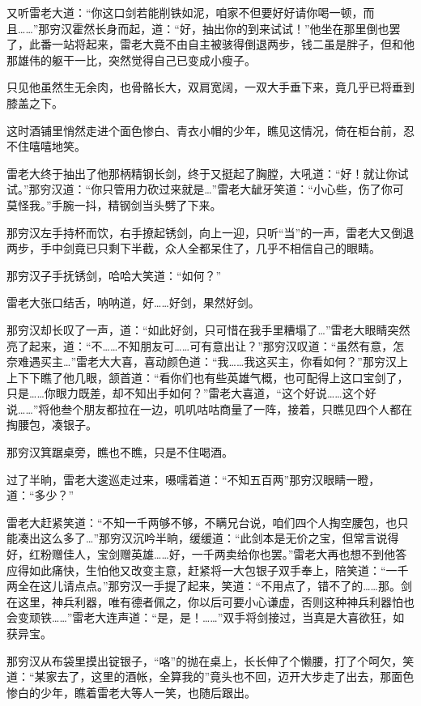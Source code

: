 \documentclass[12pt,oneside]{book}
\begin{document}
又听雷老大道：``你这口剑若能削铁如泥，咱家不但要好好请你喝一顿，而且\ldots\ldots{}''那穷汉霍然长身而起，道：``好，抽出你的到来试试！''他坐在那里倒也罢了，此番一站将起来，雷老大竟不由自主被骇得倒退两步，钱二虽是胖子，但和他那雄伟的躯干一比，突然觉得自己已变成小瘦子。

只见他虽然生无余肉，也骨骼长大，双肩宽阔，一双大手垂下来，竟几乎已将垂到膝盖之下。

这时酒铺里悄然走进个面色惨白、青衣小帽的少年，瞧见这情况，倚在柜台前，忍不住嘻嘻地笑。

雷老大终于抽出了他那柄精钢长剑，终于又挺起了胸膛，大吼道：``好！就让你试试。''那穷汉道：``你只管用力砍过来就是\ldots{}''雷老大龇牙笑道：``小心些，伤了你可莫怪我。''手腕一抖，精钢剑当头劈了下来。

那穷汉左手持杯而饮，右手撩起锈剑，向上一迎，只听``当''的一声，雷老大又倒退两步，手中剑竟已只剩下半截，众人全都呆住了，几乎不相信自己的眼睛。

那穷汉子手抚锈剑，哈哈大笑道：``如何？''

雷老大张口结舌，呐呐道，好\ldots\ldots 好剑，果然好剑。

那穷汉却长叹了一声，道：``如此好剑，只可惜在我手里糟塌了\ldots{}''雷老大眼睛突然亮了起来，道：``不\ldots\ldots 不知朋友可\ldots\ldots 可有意出让？''那穷汉叹道：``虽然有意，怎奈难遇买主\ldots{}''雷老大大喜，喜动颜色道：``我\ldots\ldots 我这买主，你看如何？''那穷汉上上下下瞧了他几眼，颔首道：``看你们也有些英雄气概，也可配得上这口宝剑了，只是\ldots\ldots 你眼力既差，却不知出手如何？''雷老大喜道，``这个好说\ldots\ldots 这个好说\ldots\ldots{}''将他叁个朋友都拉在一边，叽叽咕咕商量了一阵，接着，只瞧见四个人都在掏腰包，凑银子。

那穷汉箕踞桌旁，瞧也不瞧，只是不住喝酒。

过了半晌，雷老大逡巡走过来，嗫嚅着道：``不知五百两''那穷汉眼睛一瞪，道：``多少？''

雷老大赶紧笑道：``不知一千两够不够，不瞒兄台说，咱们四个人掏空腰包，也只能凑出这么多了\ldots{}''那穷汉沉吟半晌，缓缓道：``此剑本是无价之宝，但常言说得好，红粉赠佳人，宝剑赠英雄\ldots\ldots 好，一千两卖给你也罢。''雷老大再也想不到他答应得如此痛快，生怕他又改变主意，赶紧将一大包银子双手奉上，陪笑道：``一千两全在这儿请点点。''那穷汉一手提了起来，笑道：``不用点了，错不了的\ldots\ldots 那。剑在这里，神兵利器，唯有德者佩之，你以后可要小心谦虚，否则这种神兵利器怕也会变顽铁\ldots\ldots{}''雷老大连声道：``是，是！\ldots\ldots{}''双手将剑接过，当真是大喜欲狂，如获异宝。

那穷汉从布袋里摸出锭银子，``咯''的抛在桌上，长长伸了个懒腰，打了个呵欠，笑道：``某家去了，这里的酒帐，全算我的''竟头也不回，迈开大步走了出去，那面色惨白的少年，瞧着雷老大等人一笑，也随后跟出。
\end{document}
